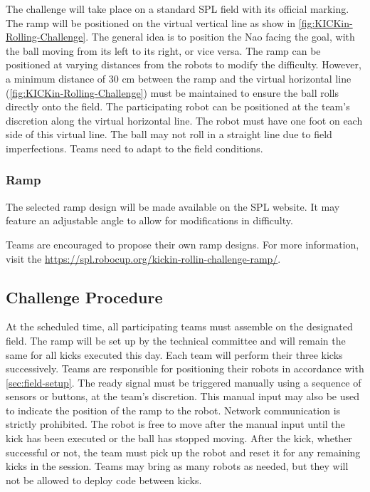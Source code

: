 The challenge will take place on a standard SPL field with its official marking. 
The ramp will be positioned on the virtual vertical line as show in \cref{fig:KICKin-Rolling-Challenge}.
The general idea is to position the Nao facing the goal, with the ball moving from its left to its right, or vice versa.
The ramp can be positioned at varying distances from the robots to modify the difficulty.
However, a minimum distance of 30 cm between the ramp and the virtual horizontal line (\cref{fig:KICKin-Rolling-Challenge}) must be maintained to ensure the ball rolls directly onto the field.
The participating robot can be positioned at the team’s discretion along the virtual horizontal line.
The robot must have one foot on each side of this virtual line.
The ball may not roll in a straight line due to field imperfections.
Teams need to adapt to the field conditions. 

\subsubsection{Ramp}

The selected ramp design will be made available on the SPL website. 
It may feature an adjustable angle to allow for modifications in difficulty.  

Teams are encouraged to propose their own ramp designs. 
For more information, visit the \url{https://spl.robocup.org/kickin-rollin-challenge-ramp/}.

\subsection{Challenge Procedure}

At the scheduled time, all participating teams must assemble on the designated field.
The ramp will be set up by the technical committee and will remain the same for all kicks executed this day.
Each team will perform their three kicks successively.
Teams are responsible for positioning their robots in accordance with \cref{sec:field-setup}.
The ready signal must be triggered manually using a sequence of sensors or buttons, at the team’s discretion.
This manual input may also be used to indicate the position of the ramp to the robot.
Network communication is strictly prohibited.
The robot is free to move after the manual input until the kick has been executed or the ball has stopped moving.
After the kick, whether successful or not, the team must pick up the robot and reset it for any remaining kicks in the session.
Teams may bring as many robots as needed, but they will not be allowed to deploy code between kicks.

